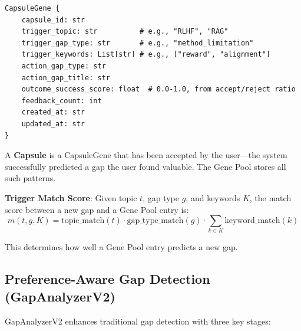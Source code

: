 \documentclass[anon,9pt]{article}
\begin{document}
\begin{verbatim}
CapsuleGene {
    capsule_id: str
    trigger_topic: str          # e.g., "RLHF", "RAG"
    trigger_gap_type: str       # e.g., "method_limitation"
    trigger_keywords: List[str] # e.g., ["reward", "alignment"]
    action_gap_type: str
    action_gap_title: str
    outcome_success_score: float  # 0.0-1.0, from accept/reject ratio
    feedback_count: int
    created_at: str
    updated_at: str
}
\end{verbatim}

A \textbf{Capsule} is a CapsuleGene that has been accepted by the user---the system successfully predicted a gap the user found valuable. The Gene Pool stores all such patterns.

\textbf{Trigger Match Score}: Given topic $t$, gap type $g$, and keywords $K$, the match score between a new gap and a Gene Pool entry is:
$$m(t, g, K) = \text{topic\_match}(t) \cdot \text{gap\_type\_match}(g) \cdot \sum_{k \in K} \text{keyword\_match}(k)$$

This determines how well a Gene Pool entry predicts a new gap.

\subsection{Preference-Aware Gap Detection (GapAnalyzerV2)}

GapAnalyzerV2 enhances traditional gap detection with three key stages:
\end{document}
